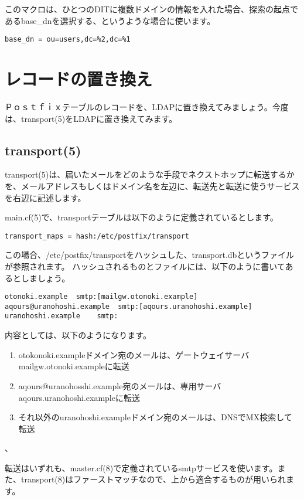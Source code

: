 このマクロは、ひとつのDITに複数ドメインの情報を入れた場合、探索の起点であるbase\_dnを選択する、というような場合に使います。

\begin{verbatim}
base_dn = ou=users,dc=%2,dc=%1
\end{verbatim}

\section{レコードの置き換え}
Ｐｏｓｔｆｉｘテーブルのレコードを、LDAPに置き換えてみましょう。今度は、transport(5)をLDAPに置き換えてみます。

\subsection{transport(5)}

transport(5)は、届いたメールをどのような手段でネクストホップに転送するかを、メールアドレスもしくはドメイン名を左辺に、転送先と転送に使うサービスを右辺に記述します。

main.cf(5)で、transportテーブルは以下のように定義されているとします。

\begin{verbatim}
transport_maps = hash:/etc/postfix/transport
\end{verbatim}

この場合、/etc/postfix/transportをハッシュした、transport.dbというファイルが参照されます。
ハッシュされるものとファイルには、以下のように書いてあるとしましょう。

\begin{verbatim}
otonoki.example  smtp:[mailgw.otonoki.example]
aqours@uranohoshi.example  smtp:[aqours.uranohoshi.example]
uranohoshi.example    smtp:
\end{verbatim}

内容としては、以下のようになります。

\begin{enumerate}
  \item otokonoki.exampleドメイン宛のメールは、ゲートウェイサーバmailgw.otonoki.exampleに転送
  \item aqours@uranohosshi.example宛のメールは、専用サーバaqours.uranohoshi.exampleに転送
  \item それ以外のuranohoshi.exampleドメイン宛のメールは、DNSでMX検索して転送
\end{enumerate}、

転送はいずれも、master.cf(8)で定義されているsmtpサービスを使います。また、transport(8)はファーストマッチなので、上から適合するものが用いられます。


